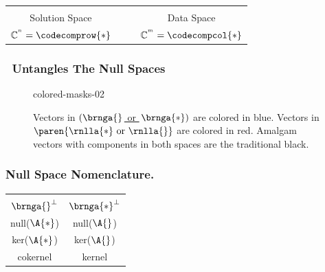 \begin{frame}
\begin{table}[htp]
{{\begin{center}
\begin{tabular}{cccc}
\begin{tikzpicture}
				\axisredCol{}
				\axisblueCol{}
			\end{tikzpicture} \\[1pt]
			Solution Space & && Data Space \\[1pt]
			$\mathbb{C}^{^{n}} = \codecomprow{*}$ &&& $\mathbb{C}^{^{m}} = \codecompcol{*} $ \\
		\end{tabular}
	\end{center}
	}}
\label{tab:ftola-master}
\end{table}
\end{frame}
%
%
\begin{frame}\frametitle{\lsq \ Untangles The Null Spaces}
\begin{figure}[t]
\centering
	\begin{overpic}[ scale = 0.75 ]{\pLocalGraphics colored-masks-02}
	\end{overpic}
\label{fig:Seeing the subspace decomposition}
\caption{Vectors in \href{https://mathworld.wolfram.com/ColumnSpace.html}{ $\left( \brnga{} \right.$ or $\left. \brnga{*}\right)$} are colored in blue. Vectors in \href{https://mathworld.wolfram.com/NullSpace.html}{ $\paren{\rnlla{*} \text{ or } \rnlla{}}$} are colored in red. Amalgam vectors with components in both spaces are the traditional black.}
\end{figure}
\end{frame}
%
%
\begin{frame}\frametitle{Null Space Nomenclature.}
%
\begin{table}[htp]
\begin{center}
\begin{tabular}{cc}
	\Nsu & \Nsv \\\hline
	 &
	 \\
	$\brnga{}^{\perp}$ & $\brnga{*}^{\perp}$  \\
	null($\A{*}$) & null($\A{}$) \\
	ker($\A{*}$) & ker($\A{}$) \\
	cokernel & kernel \\
\end{tabular}
\end{center}
\label{tab:left-and-right}
\end{table}
\end{frame}

